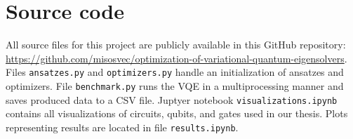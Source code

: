 \chapter{Source code}
All source files for this project are publicly available in this GitHub repository: \url{https://github.com/misosvec/optimization-of-variational-quantum-eigensolvers}. Files \texttt{ansatzes.py} and \texttt{optimizers.py} handle an initialization of ansatzes and optimizers. File \texttt{benchmark.py} runs the VQE in a multiprocessing manner and saves produced data to a CSV file. Juptyer notebook \texttt{visualizations.ipynb} contains all visualizations of circuits, qubits, and gates used in our thesis. Plots representing results are located in file \texttt{results.ipynb}.
